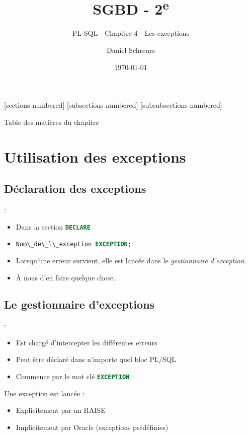 \documentclass[10pt]{beamer}
\title{SGBD - 2\textsuperscript{e}}
\subtitle{PL-SQL - Chapitre 4 - Les exceptions}
\date{\today}
\author{Daniel Schreurs}
\institute{Haute École de Province de Liège}
\begin{document}
\maketitle

[sections numbered]
[subsections numbered]
[subsubsections numbered]
\begin{frame}[allowframebreaks]{Table des matières du chapitre}
    \tableofcontents[subsectionstyle=show/show/hide,subsubsectionstyle=show/show/hide,]
\end{frame}

\section{Utilisation des exceptions}
\tocss
\subsection{Déclaration des exceptions}
\begin{frame}{\secname : \subsecname}
    \begin{itemize}
        \item Dans la section \lstinline[language=sql]!DECLARE!
        \item \lstinline[language=sql]!Nom\_de\_l\_exception EXCEPTION;!
        \item Lorsqu'une erreur survient, elle est lancée dans le \emph{gestionnaire d'exception}.
        \item À nous d'en faire quelque chose.
    \end{itemize}
\end{frame}

\subsection{Le gestionnaire d'exceptions}
\begin{frame}{\secname : \subsecname}
    \begin{itemize}
        \item Est chargé d'intercepter les différentes erreurs
        \item Peut être déclaré dans n'importe quel bloc PL/SQL
        \item Commence par le mot clé \lstinline[language=sql]!EXCEPTION!
    \end{itemize}
    Une exception est lancée :
    \begin{itemize}
        \item Explicitement par un RAISE
        \item Implicitement par Oracle (exceptions prédéfinies)
    \end{itemize}
\end{frame}
\end{document}
